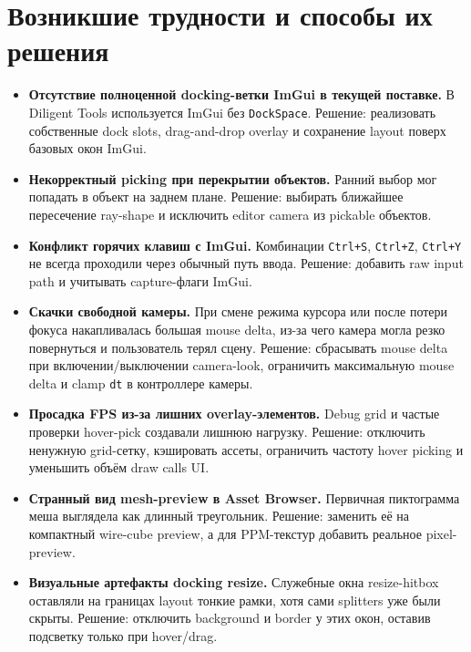 \documentclass[a4paper,14pt]{extarticle}
\begin{document}
\section{Возникшие трудности и способы их решения}
\begin{itemize}
  \item \textbf{Отсутствие полноценной docking-ветки ImGui в текущей поставке.} В Diligent Tools используется ImGui без \texttt{DockSpace}. Решение: реализовать собственные dock slots, drag-and-drop overlay и сохранение layout поверх базовых окон ImGui.

  \item \textbf{Некорректный picking при перекрытии объектов.} Ранний выбор мог попадать в объект на заднем плане. Решение: выбирать ближайшее пересечение ray-shape и исключить editor camera из pickable объектов.

  \item \textbf{Конфликт горячих клавиш с ImGui.} Комбинации \texttt{Ctrl+S}, \texttt{Ctrl+Z}, \texttt{Ctrl+Y} не всегда проходили через обычный путь ввода. Решение: добавить raw input path и учитывать capture-флаги ImGui.

  \item \textbf{Скачки свободной камеры.} При смене режима курсора или после потери фокуса накапливалась большая mouse delta, из-за чего камера могла резко повернуться и пользователь терял сцену. Решение: сбрасывать mouse delta при включении/выключении camera-look, ограничить максимальную mouse delta и clamp \texttt{dt} в контроллере камеры.

  \item \textbf{Просадка FPS из-за лишних overlay-элементов.} Debug grid и частые проверки hover-pick создавали лишнюю нагрузку. Решение: отключить ненужную grid-сетку, кэшировать ассеты, ограничить частоту hover picking и уменьшить объём draw calls UI.

  \item \textbf{Странный вид mesh-preview в Asset Browser.} Первичная пиктограмма меша выглядела как длинный треугольник. Решение: заменить её на компактный wire-cube preview, а для PPM-текстур добавить реальное pixel-preview.

  \item \textbf{Визуальные артефакты docking resize.} Служебные окна resize-hitbox оставляли на границах layout тонкие рамки, хотя сами splitters уже были скрыты. Решение: отключить background и border у этих окон, оставив подсветку только при hover/drag.


\end{itemize}
\end{document}
